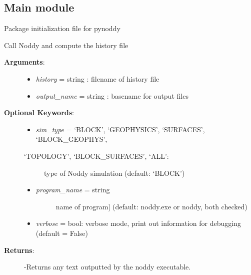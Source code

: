 \documentclass[a4paper,10pt,english]{sphinxmanual}
\begin{document}
\subsection{Main module}
\label{pynoddy:main-module}\label{pynoddy:module-pynoddy}
Package initialization file for pynoddy

\begin{fulllineitems}
\label{pynoddy:pynoddy.compute_model}
Call Noddy and compute the history file
\begin{description}
\item[{\textbf{Arguments}:}] \leavevmode\begin{itemize}
\item {} 
\emph{history} = string : filename of history file

\item {} 
\emph{output\_name} = string : basename for output files

\end{itemize}

\item[{\textbf{Optional Keywords}:}] \leavevmode\begin{itemize}
\item {} 
\emph{sim\_type} = `BLOCK', `GEOPHYSICS', `SURFACES', `BLOCK\_GEOPHYS',

\end{itemize}
\begin{description}
\item[{`TOPOLOGY', `BLOCK\_SURFACES', `ALL':}] \leavevmode
type of Noddy simulation (default: `BLOCK')

\end{description}
\begin{itemize}
\item {} \begin{description}
\item[{\emph{program\_name} = string}] \leavevmode{[}name of program{]}
(default: noddy.exe or noddy, both checked)

\end{description}

\item {} 
\emph{verbose} = bool: verbose mode, print out information for debugging (default = False)

\end{itemize}

\item[{\textbf{Returns}:}] \leavevmode
-Returns any text outputted by the noddy executable.

\end{description}

\end{fulllineitems}
\end{document}
